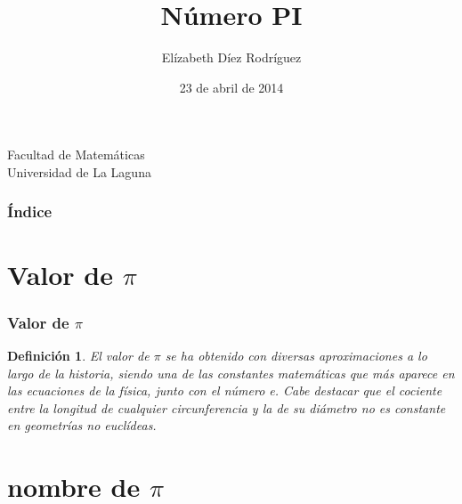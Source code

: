 \documentclass{beamer}
\title[Presentación con Beamer]{Número PI }
\author[Elízabeth Díez Rodríguez]{Elízabeth Díez Rodríguez}
\date[23-04-2014]{23 de abril de 2014}
\newtheorem{definicion}{Definición}
\begin{document}
\begin{frame}
  \titlepage
  \begin{small}
    \begin{center}
     Facultad de Matemáticas \\
     Universidad de La Laguna
    \end{center}
  \end{small}

\end{frame}
\begin{frame}
  \frametitle{Índice}
  \tableofcontents[pausesections]
\end{frame}



\section{Valor de $\pi$}


\begin{frame}

\frametitle{Valor de $\pi$}

\begin{definicion}
El valor de $\pi$ se ha obtenido con diversas aproximaciones a lo largo de la historia,
siendo una de las constantes matemáticas que más aparece en las ecuaciones de la física, junto con el número e.
Cabe destacar que el cociente entre la longitud de cualquier circunferencia y 
la de su diámetro no es constante en geometrías no euclídeas.


\end{definicion}

\end{frame}

\section{nombre de $\pi$}
\end{document}
